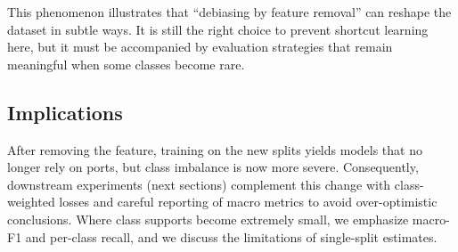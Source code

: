        This phenomenon illustrates that ``debiasing by feature removal'' can reshape the dataset in subtle ways. 
        It is still the right choice to prevent shortcut learning here, but it must be accompanied by evaluation strategies that remain meaningful when some classes become rare.

    \subsection{Implications}

        After removing the feature, training on the new splits yields models that no longer rely on ports, but class imbalance is now more severe. 
        Consequently, downstream experiments (next sections) complement this change with class-weighted losses and careful reporting of macro metrics to avoid over-optimistic conclusions. 
        Where class supports become extremely small, we emphasize macro-F1 and per-class recall, and we discuss the limitations of single-split estimates.
